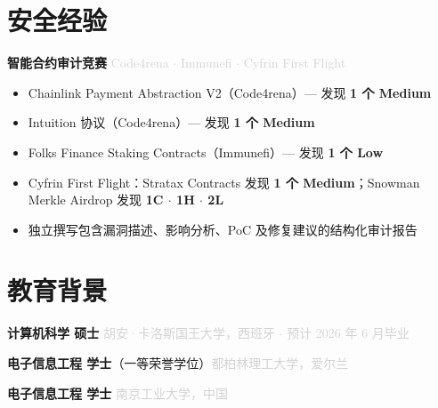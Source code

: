 \documentclass[9.5pt, a4paper]{article}
\begin{document}

\section{安全经验}

\noindent\textbf{智能合约审计竞赛} \hfill \textcolor{lightgray}{\small Code4rena $\cdot$ Immunefi $\cdot$ Cyfrin First Flight}

\begin{itemize}
  \item Chainlink Payment Abstraction V2（Code4rena）— 发现 \textbf{1 个 Medium}
  \item Intuition 协议（Code4rena）— 发现 \textbf{1 个 Medium}
  \item Folks Finance Staking Contracts（Immunefi）— 发现 \textbf{1 个 Low}
  \item Cyfrin First Flight：Stratax Contracts 发现 \textbf{1 个 Medium}；Snowman Merkle Airdrop 发现 \textbf{1C $\cdot$ 1H $\cdot$ 2L}
  \item 独立撰写包含漏洞描述、影响分析、PoC 及修复建议的结构化审计报告
\end{itemize}


\section{教育背景}

\noindent\textbf{计算机科学 硕士} \hfill \textcolor{lightgray}{胡安·卡洛斯国王大学，西班牙 $\cdot$ 预计 2026 年 6 月毕业}

\vspace{3pt}
\noindent\textbf{电子信息工程 学士}（一等荣誉学位）\hfill \textcolor{lightgray}{都柏林理工大学，爱尔兰}

\vspace{3pt}
\noindent\textbf{电子信息工程 学士} \hfill \textcolor{lightgray}{南京工业大学，中国}
\end{document}
